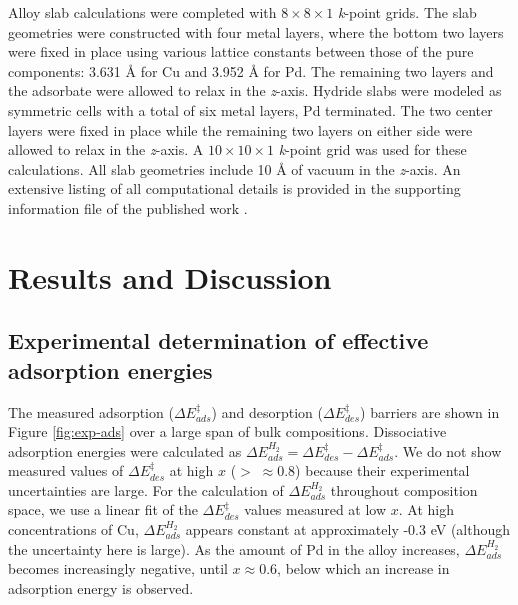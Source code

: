 \documentclass[12pt]{cmuthesis}
\begin{document}
Alloy slab calculations were completed with \(8 \times 8 \times 1\) \emph{k}-point grids. The slab geometries were constructed with four metal layers, where the bottom two layers were fixed in place using various lattice constants between those of the pure components: 3.631 \AA{} for Cu and 3.952 \AA{} for Pd. The remaining two layers and the adsorbate were allowed to relax in the \emph{z}-axis. Hydride slabs were modeled as symmetric cells with a total of six metal layers, Pd terminated. The two center layers were fixed in place while the remaining two layers on either side were allowed to relax in the \emph{z}-axis. A \(10 \times 10 \times 1\) \emph{k}-point grid was used for these calculations. All slab geometries include 10 \AA{} of vacuum in the \emph{z}-axis. An extensive listing of all computational details is provided in the supporting information file of the published work \cite{boes-2015-estim-bulk}.

\section{Results and Discussion}
\label{sec:org1c620e9}
\subsection{Experimental determination of effective adsorption energies}
\label{sec:org4632f29}
The measured adsorption (\(\Delta E^{\ddagger}_{ads}\)) and desorption (\(\Delta E^{\ddagger}_{des}\)) barriers are shown in Figure \ref{fig:exp-ads} over a large span of bulk compositions. Dissociative adsorption energies were calculated as \(\Delta E^{H_{2}}_{ads} = \Delta E^{\ddagger}_{des} - \Delta E^{\ddagger}_{ads}\). We do not show measured values of \(\Delta E^{\ddagger}_{des}\) at high \(x\) (\(> \; \approx 0.8\)) because their experimental uncertainties are large. For the calculation of \(\Delta E^{H_{2}}_{ads}\) throughout composition space, we use a linear fit of the \(\Delta E^{\ddagger}_{des}\) values measured at low \(x\). At high concentrations of Cu, \(\Delta E^{H_{2}}_{ads}\) appears constant at approximately -0.3 eV (although the uncertainty here is large). As the amount of Pd in the alloy increases, \(\Delta E^{H_{2}}_{ads}\) becomes increasingly negative, until \(x \approx 0.6\), below which an increase in adsorption energy is observed.
\end{document}
